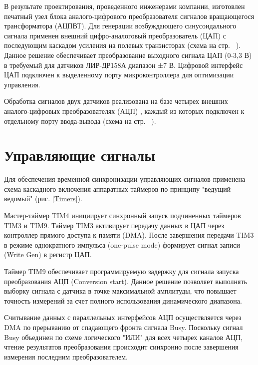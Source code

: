 В результате проектирования, проведенного инженерами компании, изготовлен печатный узел блока аналого-цифрового преобразователя сигналов вращающегося трансформатора (АЦПВТ). 
Для генерации возбуждающего синусоидального сигнала применен внешний цифро-аналоговый преобразователь (ЦАП)\cite{DAC} с последующим каскадом усиления 
на полевых транзисторах (схема на стр. ~\pageref{DAC}). Данное решение обеспечивает преобразование выходного сигнала ЦАП (0-3,3 В) в требуемый для датчиков ЛИР-ДР158А диапазон ±7 В. 
Цифровой интерфейс ЦАП подключен к выделенному порту микроконтроллера для оптимизации управления. 

Обработка сигналов двух датчиков реализована на базе четырех внешних аналого-цифровых преобразователях (АЦП) \cite{ADC}, каждый из которых подключен к 
отдельному порту ввода-вывода (схема на стр. ~\pageref{ADC}).



\FloatBarrier

\section{Управляющие сигналы}
Для обеспечения временной синхронизации управляющих сигналов применена схема каскадного включения аппаратных таймеров по принципу 
"ведущий-ведомый" (рис. \ref{Timers}). 

Мастер-таймер TIM4 инициирует синхронный запуск подчиненных таймеров TIM3 и TIM9. 
Таймер TIM3 активирует передачу данных в ЦАП через контроллер прямого доступа к памяти (DMA). 
После завершения передачи TIM3 в режиме однократного импульса (one-pulse mode) формирует сигнал записи (Write Gen) в регистр ЦАП. 

Таймер TIM9 обеспечивает программируемую задержку для сигнала запуска преобразования АЦП (Conversion start). 
Данное решение позволяет выполнять выборку сигнала с датчика в точке максимальной амплитуды, что повышает точность измерений за счет полного 
использования динамического диапазона.

Считывание данных с параллельных интерфейсов АЦП осуществляется через DMA по прерыванию от спадающего фронта сигнала Busy. 
Поскольку сигнал Busy объединен по схеме логического "ИЛИ" для всех четырех каналов АЦП, чтение результатов преобразования происходит 
синхронно после завершения измерения последним преобразователем.

